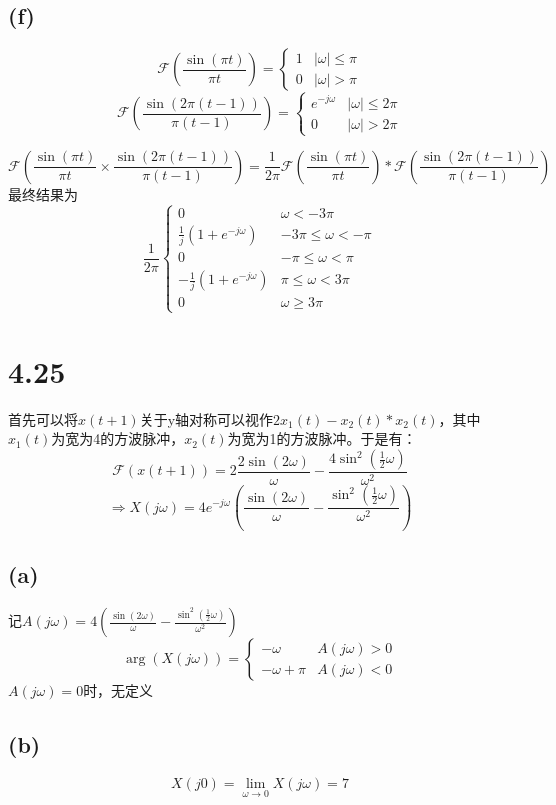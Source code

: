 \documentclass[UTF8,fontset=fandol,12pt,a4paper]{ctexart}
\begin{document}
\subsection*{(f)}
\[\mathcal{F}(\frac{\sin{(\pi t)}}{\pi t})=\begin{cases}
  1 &|\omega|\le \pi\\
  0 &|\omega|>\pi
\end{cases}\]
\[\mathcal{F}(\frac{\sin{(2\pi(t-1))}}{\pi (t-1)})=\begin{cases}
  e^{-j\omega} &|\omega|\le 2\pi\\
  0 &|\omega|>2\pi
\end{cases}\]

\[\mathcal{F}(\frac{\sin{(\pi t)}}{\pi t}\times \frac{\sin{(2\pi(t-1))}}{\pi (t-1)})=\frac{1}{2\pi}\mathcal{F}(\frac{\sin{(\pi t)}}{\pi t})*\mathcal{F}(\frac{\sin{(2\pi(t-1))}}{\pi (t-1)})\]
最终结果为\[\frac{1}{2\pi}\begin{cases}
  0 &\omega<-3\pi\\
  \frac{1}{j}(1+e^{-j\omega}) &-3\pi\le\omega<-\pi\\
  0 &-\pi\le\omega<\pi\\
  -\frac{1}{j}(1+e^{-j\omega}) &\pi\le\omega<3\pi\\
  0 &\omega\ge 3\pi

\end{cases}\]

\section*{4.25}
首先可以将$x(t+1)$关于y轴对称可以视作$2x_1(t)-x_2(t)*x_2(t)$，其中$x_1(t)$为宽为4的方波脉冲，$x_2(t)$为宽为1的方波脉冲。于是有：
\[\mathcal{F}(x(t+1))=2\frac{2\sin{(2\omega)}}{\omega}-\frac{4\sin^2{(\frac{1}{2}\omega)}}{\omega^2}\]
\[\Longrightarrow X(j\omega)=4e^{-j\omega}(\frac{\sin{(2\omega)}}{\omega}-\frac{\sin^2{(\frac{1}{2}\omega)}}{\omega^2})\]

\subsection*{(a)}
记$A(j\omega)=4(\frac{\sin{(2\omega)}}{\omega}-\frac{\sin^2{(\frac{1}{2}\omega)}}{\omega^2})$
\[\arg(X(j\omega))=\begin{cases}
  -\omega &A(j\omega)>0\\
  -\omega+\pi &A(j\omega)<0
\end{cases}\]
\indent$A(j\omega)=0$时，无定义
\subsection*{(b)}
\[X(j0)=\lim_{\omega\rightarrow0}X(j\omega)=7\]
\end{document}
